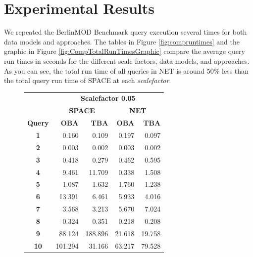 \documentclass[a4paper]{article}
\newcommand{\bmodb} {BerlinMOD Benchmark}
\begin{document}
\section{Experimental Results}
\label{sec:results}
We repeated the \bmodb{} query execution several times for both data models and
approaches. The tables in Figure \ref{fig:compruntimes} and the graphic in
Figure
\ref{fig:CompTotalRunTimesGraphic} compare the average query run times in
seconds
for the different scale factors, data models, and approaches.
As you can see, the total run time of all queries in NET is around
50\% less than the total query run time of SPACE at each \textit{scalefactor}.
\begin{figure}[h]
  \begin{minipage}{0.5\linewidth}
    \begin{tiny}
      \begin{tabular}{|c|r|r|r|r|}
        \hline
                       & \multicolumn{4}{c|}{\textbf{Scalefactor 0.05}}\\
        \cline{2-5}
                       & \multicolumn{2}{c|}{\textbf{SPACE}} & \multicolumn{2}{c|}{\textbf{NET}}\\
        \hline
        \textbf{Query} & \textbf{OBA} & \textbf{TBA} & \textbf{OBA} & \textbf{TBA}\\
        \hline
        \textbf{1}     &   0.160      &   0.109      &   0.197      &   0.097\\
        \hline
        \textbf{2}     &   0.003      &   0.002      &   0.003      &   0.002\\
        \hline
        \textbf{3}     &   0.418      &   0.279      &   0.462      &   0.595\\
        \hline
        \textbf{4}     &   9.461      &  11.709      &   0.338      &   1.508\\
        \hline
        \textbf{5}     &   1.087      &   1.632      &   1.760      &   1.238\\
        \hline
        \textbf{6}     &  13.391      &   6.461      &   5.933      &   4.016\\
        \hline
        \textbf{7}     &   3.568      &   3.213      &   5.670      &   7.024\\
        \hline
        \textbf{8}     &   0.324      &   0.351      &   0.218      &   0.208\\
        \hline
        \textbf{9}     &  88.124      & 188.896      &  21.618      &  19.758\\
        \hline
        \textbf{10}    & 101.294      &  31.166      &  63.217      &  79.528\\

\end{tabular}
\end{tiny}
\end{minipage}
\end{figure}
\end{document}
